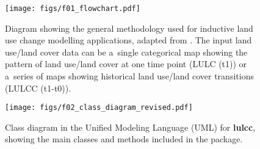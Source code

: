 \documentclass{icldt}\usepackage[]{graphicx}\usepackage[]{color}
\begin{document}
\begin{figure}[t]
  \texttt{[image: figs/f01\_flowchart.pdf]}
  \caption{Diagram showing the general methodology used for inductive land use change modelling applications, adapted from \citet{mas2014}. The input land use/land cover data can be a~single categorical map showing the pattern of land use/land cover at one time point (LULC (t1)) or a~series of maps showing historical land use/land cover transitions (LULCC (t1-t0)).}
  \label{fig:flowchart}
\end{figure}

\begin{figure}[t]
  \texttt{[image: figs/f02\_class\_diagram\_revised.pdf]}
  \caption{Class diagram in the Unified Modeling Language (UML) for \textbf{lulcc}, showing the main classes and methods included in the package.}
  \label{fig:classdiagram}
\end{figure}
\end{document}
